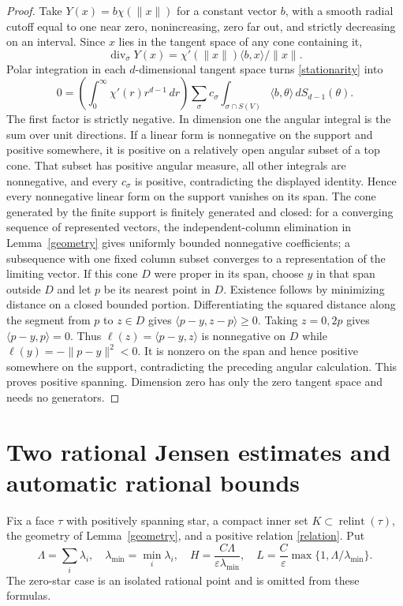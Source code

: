 \documentclass[11pt]{article}
\newcommand{\relint}{\operatorname{relint}}
\begin{document}
\begin{proof}
Take $Y(x)=b\chi(\|x\|)$ for a constant vector $b$, with a smooth radial cutoff equal to one near zero, nonincreasing, zero far out, and strictly decreasing on an interval. Since $x$ lies in the tangent space of any cone containing it,
\[\operatorname{div}_\sigma Y(x)=\chi'(\|x\|)\langle b,x\rangle/\|x\|.\]
Polar integration in each $d$-dimensional tangent space turns \eqref{stationarity} into
\[0=\left(\int_0^\infty\chi'(r)r^{d-1}\,dr\right)
 \sum_{\sigma}c_\sigma\int_{\sigma\cap S(V)}\langle b,\theta\rangle\,dS_{d-1}(\theta).
\]
The first factor is strictly negative. In dimension one the angular integral is the sum over unit directions. If a linear form is nonnegative on the support and positive somewhere, it is positive on a relatively open angular subset of a top cone. That subset has positive angular measure, all other integrals are nonnegative, and every $c_\sigma$ is positive, contradicting the displayed identity. Hence every nonnegative linear form on the support vanishes on its span. The cone generated by the finite support is finitely generated and closed: for a converging sequence of represented vectors, the independent-column elimination in Lemma~\ref{geometry} gives uniformly bounded nonnegative coefficients; a subsequence with one fixed column subset converges to a representation of the limiting vector. If this cone $D$ were proper in its span, choose $y$ in that span outside $D$ and let $p$ be its nearest point in $D$. Existence follows by minimizing distance on a closed bounded portion. Differentiating the squared distance along the segment from $p$ to $z\in D$ gives $\langle p-y,z-p\rangle\geq0$. Taking $z=0,2p$ gives $\langle p-y,p\rangle=0$. Thus $\ell(z)=\langle p-y,z\rangle$ is nonnegative on $D$ while $\ell(y)=-\|p-y\|^2<0$. It is nonzero on the span and hence positive somewhere on the support, contradicting the preceding angular calculation. This proves positive spanning. Dimension zero has only the zero tangent space and needs no generators.
\end{proof}

\section{Two rational Jensen estimates and automatic rational bounds}
Fix a face $\tau$ with positively spanning star, a compact inner set $K\subset\relint(\tau)$, the geometry of Lemma~\ref{geometry}, and a positive relation \eqref{relation}. Put
\[\Lambda=\sum_i\lambda_i,\quad \lambda_{\min}=\min_i\lambda_i,\quad H=\frac{C\Lambda}{\varepsilon\lambda_{\min}},\quad
 L=\frac{C}{\varepsilon}\max\{1,\Lambda/\lambda_{\min}\}.
\]
The zero-star case is an isolated rational point and is omitted from these formulas.
\end{document}
